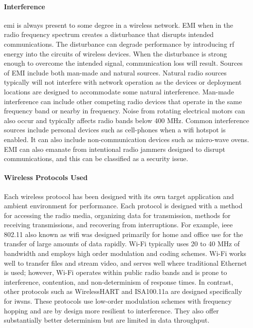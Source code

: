 \paragraph{Interference} \Gls{emi} is always present to some degree in a wireless network.  EMI when in the radio frequency spectrum creates a disturbance that disrupts intended communications.  The disturbance can degrade performance by introducing \gls{rf} energy into the circuits of wireless devices.  When the disturbance is strong enough to overcome the intended signal, communication loss will result.  Sources of EMI include both man-made and natural sources.  Natural radio sources typically will not interfere with network operation as the devices or deployment locations are designed to accommodate some natural interference.  Man-made interference can include other competing radio devices that operate in the same frequency band or nearby in frequency.  Noise from rotating electrical motors can also occur and typically affects radio bands below 400 MHz.  Common interference sources include personal devices such as cell-phones when a \gls{wifi} hotspot is enabled.  It can also include non-communication devices such as micro-wave ovens.  EMI can also emanate from intentional radio jammers designed to disrupt communications, and this can be classified as a security issue.

\paragraph{Wireless Protocols Used} Each wireless protocol has been designed with its own target application and ambient environment for performance.  Each protocol is designed with a method for accessing the radio media, organizing data for transmission, methods for receiving transmissions, and recovering from interruptions.   For example, \gls{ieee} 802.11 also known as \gls{wifi} was designed primarily for home and office use for the transfer of large amounts of data rapidly.  Wi-Fi typically uses 20 to 40 MHz of bandwidth and employs high order modulation and coding schemes.  Wi-Fi works well to transfer files and stream video, and serves well where traditional Ethernet is used; however, Wi-Fi operates within public radio bands and is prone to interference, contention, and non-determinism of response times.  In contrast, other protocols such as WirelessHART and ISA100.11a are designed specifically for \glspl{iwsn}.  These protocols use low-order modulation schemes with frequency hopping and are by design more resilient to interference.  They also offer substantially better determinism but are limited in data throughput.

